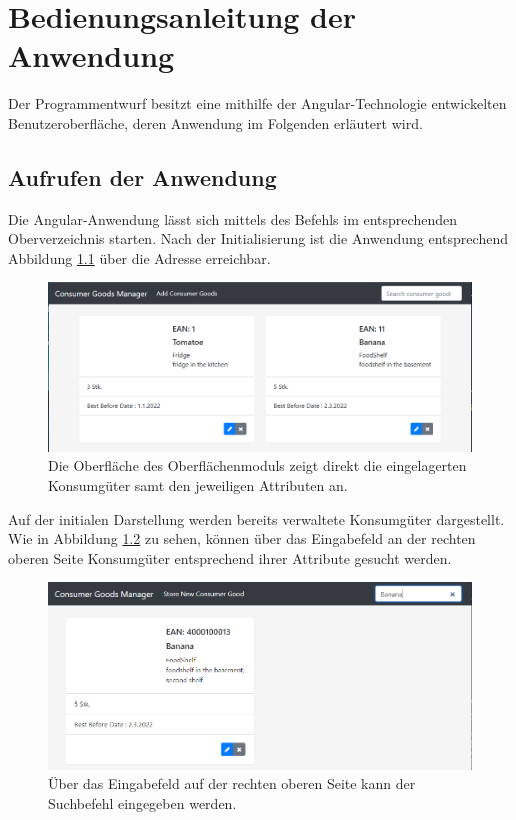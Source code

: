\chapter{Bedienungsanleitung der Anwendung}
\label{Bedienungsanleitung}
Der Programmentwurf besitzt eine mithilfe der Angular-Technologie entwickelten Benutzeroberfläche, deren Anwendung im Folgenden erläutert wird.

\section{Aufrufen der Anwendung}
Die Angular-Anwendung lässt sich mittels des Befehls  im entsprechenden Oberverzeichnis starten.
Nach der Initialisierung ist die Anwendung entsprechend Abbildung \ref{fig:gui-initial-screen} über die Adresse \href{http://localhost:4200}{} erreichbar.

\begin{figure}[H]
	\centering
	\includegraphics[width=1.0\textwidth]{Bilder/gui/gui-initial-screen.PNG}
	\caption[Grafische Oberfläche des Oberflächenmoduls.]{Die Oberfläche des Oberflächenmoduls zeigt direkt die eingelagerten Konsumgüter samt den jeweiligen Attributen an.}
	\label{fig:gui-initial-screen}
\end{figure}

Auf der initialen Darstellung werden bereits verwaltete Konsumgüter dargestellt.
Wie in Abbildung \ref{fig:gui-search} zu sehen, können über das Eingabefeld an der rechten oberen Seite Konsumgüter entsprechend ihrer Attribute gesucht werden.

\begin{figure}[H]
	\centering
	\includegraphics[width=1.0\textwidth]{Bilder/gui/new/gui-search.PNG}
	\caption[Suchfunktion der Oberfläche.]{Über das Eingabefeld auf der rechten oberen Seite kann der Suchbefehl eingegeben werden.}
	\label{fig:gui-search}
\end{figure}

